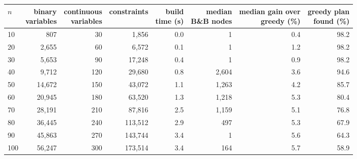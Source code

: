 \begin{tabular}{lrrrrrrr}\toprule
$n$ & \shortstack{binary\\variables} & \shortstack{continuous\\variables} & constraints & \shortstack{build\\time (s)} & \shortstack{median\\B\&B nodes} & \shortstack{median gain over\\greedy (\%)} & \shortstack{greedy plan\\found (\%)} \\ \midrule
10 & 807 & 30 & 1,856 & 0.0 & 1 & 0.4 & 98.2 \\
20 & 2,655 & 60 & 6,572 & 0.1 & 1 & 1.2 & 98.2 \\
30 & 5,653 & 90 & 17,248 & 0.4 & 1 & 0.9 & 98.2 \\
40 & 9,712 & 120 & 29,680 & 0.8 & 2,604 & 3.6 & 94.6 \\
50 & 14,672 & 150 & 43,072 & 1.1 & 1,263 & 4.2 & 85.7 \\
60 & 20,945 & 180 & 63,520 & 1.3 & 1,218 & 5.3 & 80.4 \\
70 & 28,191 & 210 & 87,816 & 2.5 & 1,159 & 5.1 & 76.8 \\
80 & 36,445 & 240 & 113,512 & 2.9 & 497 & 5.3 & 67.9 \\
90 & 45,863 & 270 & 143,744 & 3.4 & 1 & 5.6 & 64.3 \\
100 & 56,247 & 300 & 173,514 & 3.4 & 164 & 5.7 & 58.9 \\
\bottomrule\end{tabular}
